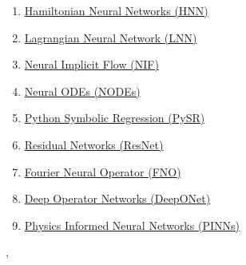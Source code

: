 \documentclass[11pt]{article}
\renewcommand{\today}{\shortmonthname[\the\month] \the \day,  \the\year}
\begin{document}
\begin{enumerate}
	\item  \href{https://mp.weixin.qq.com/s/rPDTlcpQhwVKn24GBj-lPw}{Hamiltonian Neural Networks (HNN)} %
	\item  \href{https://mp.weixin.qq.com/s/Qm_KB7Dt-LFNABctATuOlg}{Lagrangian Neural Network (LNN)} %
	\item  \href{https://mp.weixin.qq.com/s/zIFQfJ2YXiGAYp26u7TVXw}{Neural Implicit Flow (NIF)} %
	\item  \href{https://mp.weixin.qq.com/s/DJ9W3NngqNN69zFavPR7jQ}{Neural ODEs (NODEs)} %
	\item  \href{https://mp.weixin.qq.com/s/48IrFK3okhCm1VEPHHN-gg}{Python Symbolic Regression (PySR)} %
	\item  \href{https://mp.weixin.qq.com/s/csjZ0DS-f3IO93-lQzjzbw}{Residual Networks (ResNet)} %
	\item  \href{https://mp.weixin.qq.com/s/uXlx5kTpXeQd14Zer_Gr4g}{Fourier Neural Operator (FNO)} %
	\item  \href{https://mp.weixin.qq.com/s/FKecs-6h9zoum5WfU97W0gL}{Deep Operator Networks (DeepONet)} %
	\item  \href{https://mp.weixin.qq.com/s/p0ryb-hG9WWqer0oZCjY5A}{Physics Informed Neural Networks (PINNs)} %
\end{enumerate}




%
\begin{flushright}
	\tiny \today 
\end{flushright}
\end{document}
